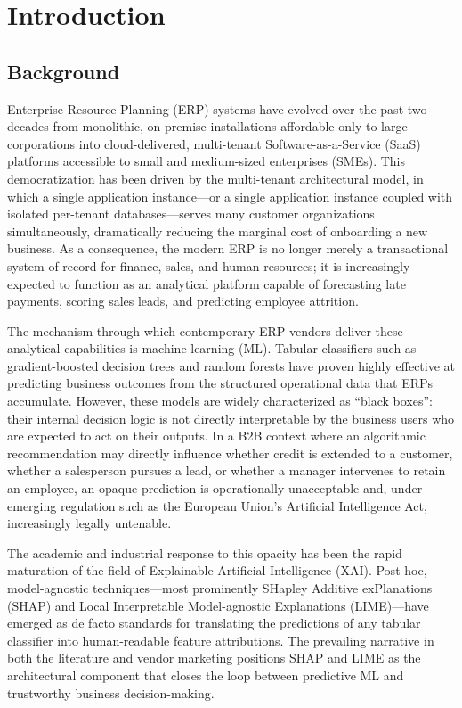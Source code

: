 \chapter{Introduction}
\label{ch:introduction}

\section{Background}
\label{sec:background}

Enterprise Resource Planning (ERP) systems have evolved over the past two decades from monolithic, on-premise installations affordable only to large corporations into cloud-delivered, multi-tenant Software-as-a-Service (SaaS) platforms accessible to small and medium-sized enterprises (SMEs). This democratization has been driven by the multi-tenant architectural model, in which a single application instance---or a single application instance coupled with isolated per-tenant databases---serves many customer organizations simultaneously, dramatically reducing the marginal cost of onboarding a new business. As a consequence, the modern ERP is no longer merely a transactional system of record for finance, sales, and human resources; it is increasingly expected to function as an analytical platform capable of forecasting late payments, scoring sales leads, and predicting employee attrition.

The mechanism through which contemporary ERP vendors deliver these analytical capabilities is machine learning (ML). Tabular classifiers such as gradient-boosted decision trees and random forests have proven highly effective at predicting business outcomes from the structured operational data that ERPs accumulate. However, these models are widely characterized as ``black boxes'': their internal decision logic is not directly interpretable by the business users who are expected to act on their outputs. In a B2B context where an algorithmic recommendation may directly influence whether credit is extended to a customer, whether a salesperson pursues a lead, or whether a manager intervenes to retain an employee, an opaque prediction is operationally unacceptable and, under emerging regulation such as the European Union's Artificial Intelligence Act, increasingly legally untenable.

The academic and industrial response to this opacity has been the rapid maturation of the field of Explainable Artificial Intelligence (XAI). Post-hoc, model-agnostic techniques---most prominently SHapley Additive exPlanations (SHAP) and Local Interpretable Model-agnostic Explanations (LIME)---have emerged as de facto standards for translating the predictions of any tabular classifier into human-readable feature attributions. The prevailing narrative in both the literature and vendor marketing positions SHAP and LIME as the architectural component that closes the loop between predictive ML and trustworthy business decision-making.

